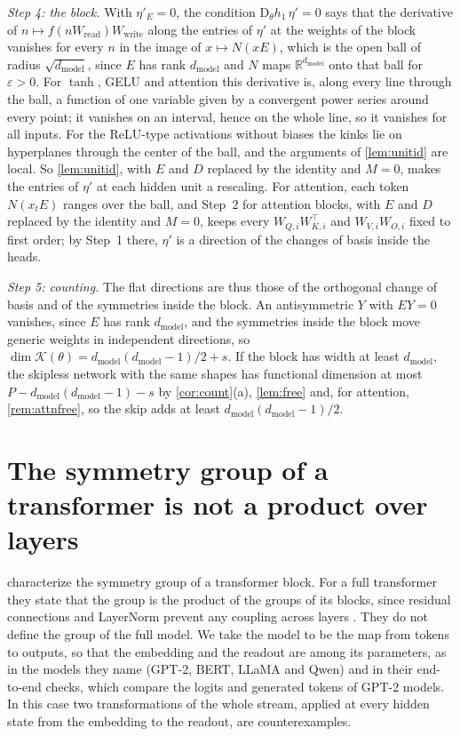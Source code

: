 \documentclass[10pt]{article}
\theoremstyle{definition}
\theoremstyle{remark}
\newcommand{\R}{\mathbb{R}}
\newcommand{\Wread}{W_{\mathrm{read}}}
\newcommand{\Wwrite}{W_{\mathrm{write}}}
\newcommand{\dm}{d_{\mathrm{model}}}
\newcommand{\Der}{\mathrm{D}}
\begin{document}
\emph{Step 4: the block.} With $\eta'_E = 0$, the condition $\Der_\theta h_1\,\eta' = 0$ says that the derivative of $n \mapsto f(n\Wread)\Wwrite$ along the entries of $\eta'$ at the weights of the block vanishes for every $n$ in the image of $x \mapsto N(xE)$, which is the open ball of radius $\sqrt{\dm}$, since $E$ has rank $\dm$ and $N$ maps $\R^{\dm}$ onto that ball for $\varepsilon > 0$. For $\tanh$, GELU and attention this derivative is, along every line through the ball, a function of one variable given by a convergent power series around every point; it vanishes on an interval, hence on the whole line, so it vanishes for all inputs. For the ReLU-type activations without biases the kinks lie on hyperplanes through the center of the ball, and the arguments of \cref{lem:unitid} are local. So \cref{lem:unitid}, with $E$ and $D$ replaced by the identity and $M = 0$, makes the entries of $\eta'$ at each hidden unit a rescaling. For attention, each token $N(x_tE)$ ranges over the ball, and Step~2 for attention blocks, with $E$ and $D$ replaced by the identity and $M = 0$, keeps every $W_{Q,i}W_{K,i}^\top$ and $W_{V,i}W_{O,i}$ fixed to first order; by Step~1 there, $\eta'$ is a direction of the changes of basis inside the heads.

\emph{Step 5: counting.} The flat directions are thus those of the orthogonal change of basis and of the symmetries inside the block. An antisymmetric $Y$ with $EY = 0$ vanishes, since $E$ has rank $\dm$, and the symmetries inside the block move generic weights in independent directions, so $\dim\mathcal K(\theta) = \dm(\dm-1)/2 + s$. If the block has width at least $\dm$, the skipless network with the same shapes has functional dimension at most $P - \dm(\dm-1) - s$ by \cref{cor:count}(a), \cref{lem:free} and, for attention, \cref{rem:attnfree}, so the skip adds at least $\dm(\dm-1)/2$.

\FloatBarrier
\section{The symmetry group of a transformer is not a product over layers}\label{app:product}

\citet{wang2025gauge} characterize the symmetry group of a transformer block. For a full transformer they state that the group is the product of the groups of its blocks, since residual connections and LayerNorm prevent any coupling across layers \citep[Theorem~7]{wang2025gauge}. They do not define the group of the full model. We take the model to be the map from tokens to outputs, so that the embedding and the readout are among its parameters, as in the models they name (GPT-2, BERT, LLaMA and Qwen) and in their end-to-end checks, which compare the logits and generated tokens of GPT-2 models. In this case two transformations of the whole stream, applied at every hidden state from the embedding to the readout, are counterexamples.
\end{document}
